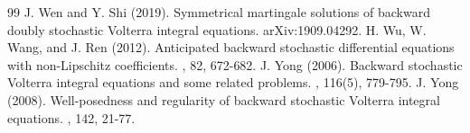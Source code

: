 \documentclass[12pt]{article}
\theoremstyle{remark}
\numberwithin{equation}{section}
\begin{document}
\begin{thebibliography}{99}
J. Wen and Y. Shi (2019).
\newblock Symmetrical martingale solutions of backward doubly stochastic Volterra integral equations.
\newblock arXiv:1909.04292.
H. Wu, W. Wang, and J. Ren (2012).
\newblock Anticipated backward stochastic differential equations with non-Lipschitz coefficients.
, 82, 672-682.
J. Yong (2006).
\newblock Backward stochastic Volterra integral equations and some related problems.
, 116(5), 779-795.
J. Yong (2008).
\newblock Well-posedness and regularity of backward stochastic Volterra integral equations.
, 142, 21-77.
\end{thebibliography}
\end{document}

